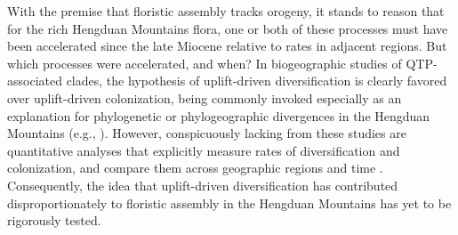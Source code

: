 With the premise that floristic assembly tracks orogeny, it stands to reason that for the rich Hengduan Mountains flora, one or both of these processes must have been accelerated since the late Miocene relative to rates in adjacent regions. But which processes were accelerated, and when? In biogeographic studies of QTP-associated clades, the hypothesis of uplift-driven diversification is clearly favored over uplift-driven colonization, being commonly invoked especially as an explanation for phylogenetic or phylogeographic divergences in the Hengduan Mountains (e.g., \citealt{LiuJ2006,WangY2009,ZhangJ2014}). However, conspicuously lacking from these studies are quantitative analyses that explicitly measure rates of diversification and colonization, and compare them across geographic regions and time \citep{Wen2014,Favre2014}. Consequently, the idea that uplift-driven diversification has contributed disproportionately to floristic assembly in the Hengduan Mountains has yet to be rigorously tested.





